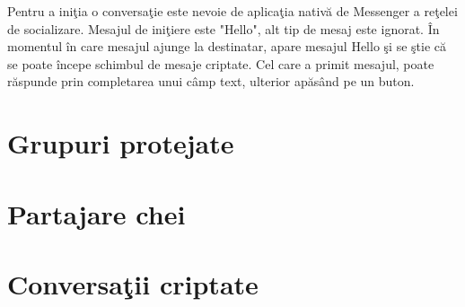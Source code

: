 Pentru a ini\c{t}ia o conversa\c{t}ie este nevoie de aplica\c{t}ia nativ\u{a} de Messenger a re\c{t}elei de socializare. Mesajul de ini\c{t}iere este "Hello", alt tip de mesaj este ignorat. \^{I}n momentul \^{i}n care mesajul ajunge la destinatar, apare mesajul Hello \c{s}i se \c{s}tie c\u{a} se poate \^{i}ncepe schimbul de mesaje criptate. Cel care a primit mesajul, poate r\u{a}spunde prin completarea unui c\^{a}mp text, ulterior ap\u{a}s\^{a}nd pe un buton.



\section{Grupuri protejate}

\section{Partajare chei}

\section{Conversa\c{t}ii criptate}
